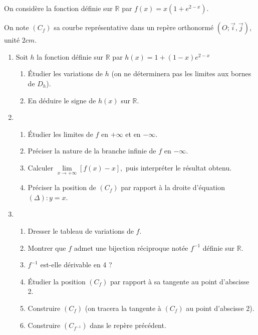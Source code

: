 \documentclass[12pt,a4paper]{article}
\begin{document}
\section*{}

On considère la fonction définie sur \( \mathbb{R} \) par  \( f(x) = x \left(1 + e^{2-x} \right). \)

On note \( (C_f) \) sa courbe représentative dans un repère orthonormé \( (O; \vec{i}, \vec{j}) \), unité \( 2cm \).

\begin{enumerate}
    \item Soit \( h \) la fonction définie sur \( \mathbb{R} \) par  \( h(x) = 1 + (1 - x)e^{2-x} \)
          \begin{enumerate}
              \item Étudier les variations de \( h \) (on ne déterminera pas les limites aux bornes de \( D_h \)).
              \item En déduire le signe de \( h(x) \) sur \( \mathbb{R} \).
          \end{enumerate}
    \item
          \begin{enumerate}
              \item Étudier les limites de \( f \) en \( +\infty \) et en \( -\infty \).
              \item Préciser la nature de la branche infinie de \( f \) en \( -\infty \).
              \item Calculer  \( \lim\limits_{x \to +\infty} \left[ f(x) - x \right], \) puis interpréter le résultat obtenu.
              \item Préciser la position de \( (C_f) \) par rapport à la droite d’équation \( (\Delta) : y = x \).
          \end{enumerate}
    \item
          \begin{enumerate}
              \item Dresser le tableau de variations de \( f \).
              \item Montrer que \( f \) admet une bijection réciproque notée \( f^{-1} \) définie sur \( \mathbb{R} \).
              \item \( f^{-1} \) est-elle dérivable en 4 ?
              \item Étudier la position \( (C_f) \) par rapport à sa tangente au point d’abscisse 2.
              \item Construire \( (C_f) \) (on tracera la tangente à \( (C_f) \) au point d’abscisse 2).
              \item Construire \( (C_{f^{-1}}) \) dans le repère précédent.
          \end{enumerate}
\end{enumerate}
\end{document}
